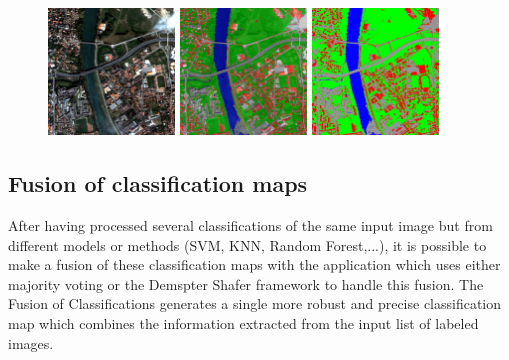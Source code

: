 \begin{figure}[!h]
  \center
  \includegraphics[width=0.3\textwidth]{../Art/MonteverdiImages/classification_chain_inputimage.jpg}
  \includegraphics[width=0.3\textwidth]{../Art/MonteverdiImages/classification_chain_fancyclassif_fusion.jpg}
  \includegraphics[width=0.3\textwidth]{../Art/MonteverdiImages/classification_chain_fancyclassif.jpg}
  \label{fig:MeanShiftVectorImageFilter}
\end{figure}




\subsection{Fusion of classification maps}\label{ssec:fusionofclassifications}

After having processed several classifications of the same input image but from 
different models or methods (SVM, KNN, Random Forest,...), it is possible to make a 
fusion of these classification maps with the  
application which uses either majority voting or the Demspter Shafer framework to 
handle this fusion. The Fusion of Classifications generates a single more robust and 
precise classification map which combines the information extracted from the input 
list of labeled images. 

